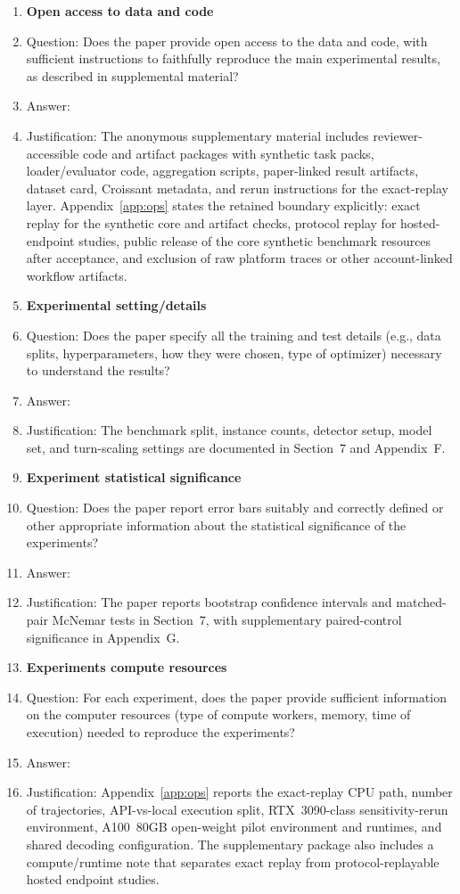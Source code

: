 \begin{enumerate}
\item \textbf{Open access to data and code}
\item[] Question: Does the paper provide open access to the data and code, with sufficient instructions to faithfully reproduce the main experimental results, as described in supplemental material?
\item[] Answer: \answerYes{}
\item[] Justification: The anonymous supplementary material includes reviewer-accessible code and artifact packages with synthetic task packs, loader/evaluator code, aggregation scripts, paper-linked result artifacts, dataset card, Croissant metadata, and rerun instructions for the exact-replay layer. Appendix~\ref{app:ops} states the retained boundary explicitly: exact replay for the synthetic core and artifact checks, protocol replay for hosted-endpoint studies, public release of the core synthetic benchmark resources after acceptance, and exclusion of raw platform traces or other account-linked workflow artifacts.

\item \textbf{Experimental setting/details}
\item[] Question: Does the paper specify all the training and test details (e.g., data splits, hyperparameters, how they were chosen, type of optimizer) necessary to understand the results?
\item[] Answer: \answerYes{}
\item[] Justification: The benchmark split, instance counts, detector setup, model set, and turn-scaling settings are documented in Section~7 and Appendix~F.

\item \textbf{Experiment statistical significance}
\item[] Question: Does the paper report error bars suitably and correctly defined or other appropriate information about the statistical significance of the experiments?
\item[] Answer: \answerYes{}
\item[] Justification: The paper reports bootstrap confidence intervals and matched-pair McNemar tests in Section~7, with supplementary paired-control significance in Appendix~G.

\item \textbf{Experiments compute resources}
\item[] Question: For each experiment, does the paper provide sufficient information on the computer resources (type of compute workers, memory, time of execution) needed to reproduce the experiments?
\item[] Answer: \answerYes{}
\item[] Justification: Appendix~\ref{app:ops} reports the exact-replay CPU path, number of trajectories, API-vs-local execution split, RTX~3090-class sensitivity-rerun environment, A100~80GB open-weight pilot environment and runtimes, and shared decoding configuration. The supplementary package also includes a compute/runtime note that separates exact replay from protocol-replayable hosted endpoint studies.


\end{enumerate}
